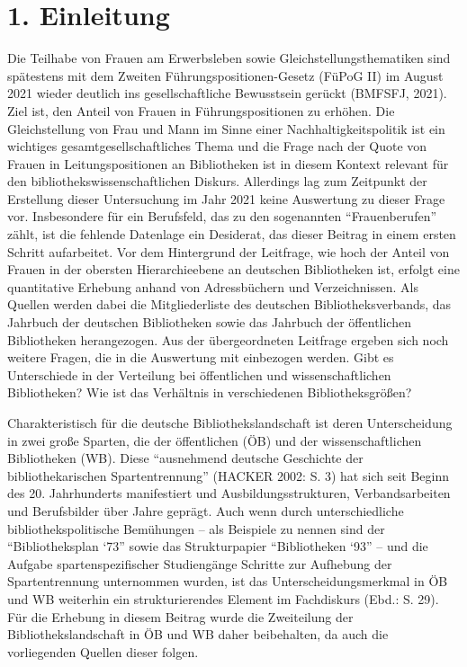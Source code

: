 \documentclass[a4paper,
fontsize=11pt,
oneside,
numbers=noperiodatend,
parskip=half-,
bibliography=totoc,
final
]{scrartcl}
\begin{document}
\hypertarget{einleitung}{%
\section{1. Einleitung}\label{einleitung}}

Die Teilhabe von Frauen am Erwerbsleben sowie Gleichstellungsthematiken
sind spätestens mit dem Zweiten Führungspositionen-Gesetz (FüPoG II) im
August 2021 wieder deutlich ins gesellschaftliche Bewusstsein gerückt
(BMFSFJ, 2021). Ziel ist, den Anteil von Frauen in Führungspositionen zu
erhöhen. Die Gleichstellung von Frau und Mann im Sinne einer
Nachhaltigkeitspolitik ist ein wichtiges gesamtgesellschaftliches Thema
und die Frage nach der Quote von Frauen in Leitungspositionen an
Bibliotheken ist in diesem Kontext relevant für den
bibliothekswissenschaftlichen Diskurs. Allerdings lag zum Zeitpunkt der
Erstellung dieser Untersuchung im Jahr 2021 keine Auswertung zu dieser
Frage vor. Insbesondere für ein Berufsfeld, das zu den sogenannten
\enquote{Frauenberufen} zählt, ist die fehlende Datenlage ein Desiderat,
das dieser Beitrag in einem ersten Schritt aufarbeitet. Vor dem
Hintergrund der Leitfrage, wie hoch der Anteil von Frauen in der
obersten Hierarchieebene an deutschen Bibliotheken ist, erfolgt eine
quantitative Erhebung anhand von Adressbüchern und Verzeichnissen. Als
Quellen werden dabei die Mitgliederliste des deutschen
Bibliotheksverbands, das Jahrbuch der deutschen Bibliotheken sowie das
Jahrbuch der öffentlichen Bibliotheken herangezogen. Aus der
übergeordneten Leitfrage ergeben sich noch weitere Fragen, die in die
Auswertung mit einbezogen werden. Gibt es Unterschiede in der Verteilung
bei öffentlichen und wissenschaftlichen Bibliotheken? Wie ist das
Verhältnis in verschiedenen Bibliotheksgrößen?

Charakteristisch für die deutsche Bibliothekslandschaft ist deren
Unterscheidung in zwei große Sparten, die der öffentlichen (ÖB) und der
wissenschaftlichen Bibliotheken (WB). Diese \enquote{ausnehmend deutsche
Geschichte der bibliothekarischen Spartentrennung} (HACKER 2002: S. 3)
hat sich seit Beginn des 20. Jahrhunderts manifestiert und
Ausbildungsstrukturen, Verbandsarbeiten und Berufsbilder über Jahre
geprägt. Auch wenn durch unterschiedliche bibliothekspolitische
Bemühungen -- als Beispiele zu nennen sind der \enquote{Bibliotheksplan
`73} sowie das Strukturpapier \enquote{Bibliotheken `93} -- und die
Aufgabe spartenspezifischer Studiengänge Schritte zur Aufhebung der
Spartentrennung unternommen wurden, ist das Unterscheidungsmerkmal in ÖB
und WB weiterhin ein strukturierendes Element im Fachdiskurs (Ebd.: S.
29). Für die Erhebung in diesem Beitrag wurde die Zweiteilung der
Bibliothekslandschaft in ÖB und WB daher beibehalten, da auch die
vorliegenden Quellen dieser folgen.
\end{document}
